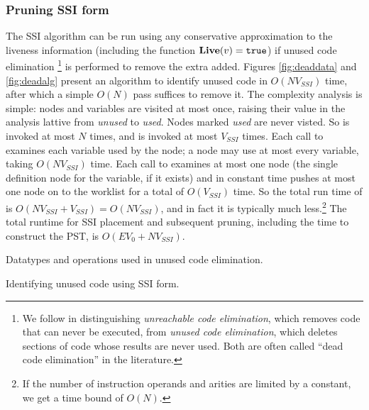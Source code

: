 \documentclass[12pt,titlepage,twoside]{article}
\begin{document}
\subsubsection{Pruning SSI form}\label{sec:unusedcode}
The SSI algorithm can be run using any conservative approximation to
the liveness information
(including the function $\text{\bf Live}(v)=\text{\tt true}$) if
unused code elimination%
\footnote{We follow \cite{wegman91:scc} in distinguishing
\emph{unreachable code elimination}, which removes code that can never
be executed, from \emph{unused code elimination}, which deletes
sections of code whose results are never used.  Both are often called
``dead code elimination'' in the literature.}  is performed to remove
the extra  added.  Figures \ref{fig:deaddata} and
\ref{fig:deadalg} present an algorithm to identify unused code in
$O(N V_{SSI})$ time, after which a simple $O(N)$ pass suffices to remove it.
The complexity analysis is simple: nodes and variables are visited at
most once, raising their value in the analysis lattive from
\emph{unused} to \emph{used}.  Nodes marked \emph{used} are never
visted.  So  is invoked at most $N$ times, and
 is invoked at most $V_{SSI}$ times.  Each call to
 examines each variable used by the node; a
node may use at most every variable, taking $O(N V_{SSI})$ time.  Each call
to  examines at most one node (the single
definition node for the variable, if it exists) and in constant time
pushes at most one node on to the worklist for a total of $O(V_{SSI})$ time.
So the total run time of  is
$O(N V_{SSI}+V_{SSI})=O(N V_{SSI})$, and
in fact it is typically much less.\footnote{If the number of instruction
operands and \phisigfunction{} arities are limited by a
constant, we get a time bound of $O(N)$.}  The total runtime for SSI
placement and subsequent pruning, including the time to construct the
PST, is $O(EV_0 + NV_{SSI})$.

\begin{myfigure}\small

\caption{Datatypes and operations used in unused code elimination.}
\label{fig:deaddata}
\end{myfigure}

\begin{myfigure}\small\linespread{0.75}

\caption{Identifying unused code using SSI form.}
\label{fig:deadalg}
\end{myfigure}
\end{document}
